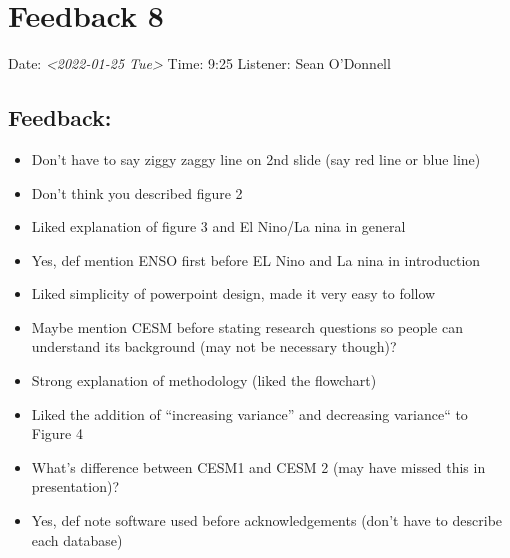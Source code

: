 \documentclass[little]{basic}
\begin{document}
\section{Feedback 8}
\label{sec:org6818510}
Date: \textit{<2022-01-25 Tue>}
Time: 9:25
Listener: Sean O'Donnell
\subsection*{Feedback:}
\label{sec:orge3ca3f6}
\begin{itemize}
\item Don't have to say ziggy zaggy line on 2nd slide (say red line or blue line)
\item Don't think you described figure 2
\item Liked explanation of figure 3 and El Nino/La nina in general
\item Yes, def mention ENSO first before EL Nino and La nina in introduction
\item Liked simplicity of powerpoint design, made it very easy to follow
\item Maybe mention CESM before stating research questions so people can understand its background (may not be necessary though)?
\item Strong explanation of methodology (liked the flowchart)
\item Liked the addition of ``increasing variance'' and decreasing variance`` to Figure 4
\item What's difference between CESM1 and CESM 2 (may have missed this in presentation)?
\item Yes, def note software used before acknowledgements (don't have to describe each database)
\end{itemize}
\end{document}
